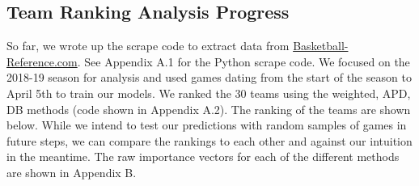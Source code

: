 \documentclass[12pt]{article}%
\begin{document}
\subsection{Team Ranking Analysis Progress}
\null\quad\quad So far, we wrote up the scrape code to extract data from \href{https://www.basketball-reference.com/}{Basketball-Reference.com}. See Appendix A.1 for the Python scrape code. We focused on the 2018-19 season for analysis and used games dating from the start of the season to April 5th to train our models. We ranked the 30 teams using the weighted, APD, DB methods (code shown in Appendix A.2). The ranking of the teams are shown below. While we intend to test our predictions with random samples of games in future steps, we can compare the rankings to each other and against our intuition in the meantime. The raw importance vectors for each of the different methods are shown in Appendix B.
\end{document}
